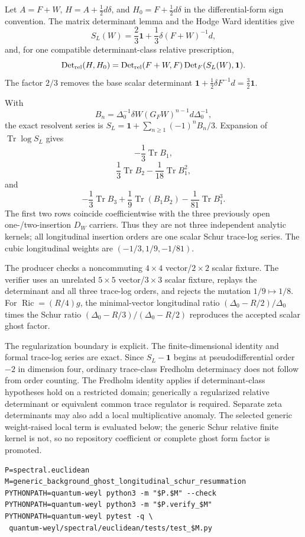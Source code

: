 \documentclass[11pt]{article}
\theoremstyle{definition}
\theoremstyle{remark}
\begin{document}
Let $A=F+W$, $H=A+\frac12d\delta$, and
$H_0=F+\frac12d\delta$ in the differential-form sign convention.  The
matrix determinant lemma and the Hodge Ward identities give
\[
 S_L(W)=\frac23\mathbf1+\frac13\delta(F+W)^{-1}d,
\]
and, for one compatible determinant-class relative prescription,
\[
 \operatorname{Det}_{\rm rel}(H,H_0)
 =\operatorname{Det}_{\rm rel}(F+W,F)
  \operatorname{Det}_{F}(S_L(W),\mathbf1).
\]
The factor $2/3$ removes the base scalar determinant
$\mathbf1+\frac12\delta F^{-1}d=\frac32\mathbf1$.

With
\[
 B_n=\Delta_0^{-1}\delta W(G_FW)^{n-1}d\Delta_0^{-1},
\]
the exact resolvent series is
$S_L=\mathbf1+\sum_{n\geq1}(-1)^nB_n/3$.  Expansion of
$\operatorname{Tr}\log S_L$ gives
\[
 -\frac13\operatorname{Tr}B_1,
\]
\[
 \frac13\operatorname{Tr}B_2-\frac1{18}\operatorname{Tr}B_1^2,
\]
and
\[
 -\frac13\operatorname{Tr}B_3
 +\frac19\operatorname{Tr}(B_1B_2)
 -\frac1{81}\operatorname{Tr}B_1^3.
\]
The first two rows coincide coefficientwise with the three previously open
one-/two-insertion $D_W$ carriers.  Thus they are not three independent
analytic kernels; all longitudinal insertion orders are one scalar Schur
trace-log series.  The cubic longitudinal weights are
$(-1/3,1/9,-1/81)$.

The producer checks a noncommuting $4\times4$ vector/$2\times2$ scalar
fixture.  The verifier uses an unrelated $5\times5$ vector/$3\times3$ scalar
fixture, replays the determinant and all three trace-log orders, and rejects
the mutation $1/9\mapsto1/8$.  For
$\operatorname{Ric}=(R/4)g$, the minimal-vector longitudinal ratio
$(\Delta_0-R/2)/\Delta_0$ times the Schur ratio
$(\Delta_0-R/3)/(\Delta_0-R/2)$ reproduces the accepted scalar ghost factor.

The regularization boundary is explicit.  The finite-dimensional identity
and formal trace-log series are exact.  Since $S_L-\mathbf1$ begins at
pseudodifferential order $-2$ in dimension four, ordinary trace-class
Fredholm determinacy does not follow from order counting.  The Fredholm
identity applies if determinant-class hypotheses hold on a restricted
domain; generically a regularized relative determinant or equivalent common
trace regulator is required.  Separate zeta determinants may also add a
local multiplicative anomaly.  The selected generic weight-raised local term
is evaluated below; the generic Schur relative finite kernel is not, so no
repository coefficient or complete ghost form factor is promoted.

\begin{verbatim}
P=spectral.euclidean
M=generic_background_ghost_longitudinal_schur_resummation
PYTHONPATH=quantum-weyl python3 -m "$P.$M" --check
PYTHONPATH=quantum-weyl python3 -m "$P.verify_$M"
PYTHONPATH=quantum-weyl pytest -q \
 quantum-weyl/spectral/euclidean/tests/test_$M.py
\end{verbatim}
\end{document}
